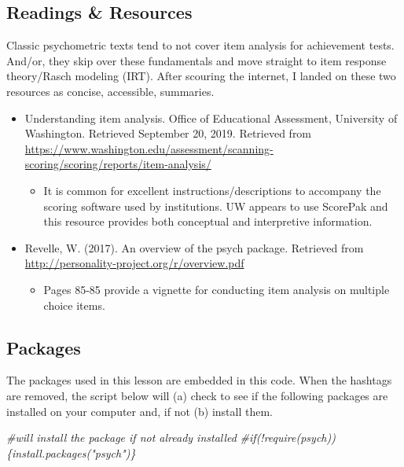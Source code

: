 \documentclass[
  english,
]{book}
\newenvironment{Shaded}{\begin{snugshade}}{\end{snugshade}}
\newcommand{\CommentTok}[1]{\textcolor[rgb]{0.56,0.35,0.01}{\textit{#1}}}
\providecommand{\tightlist}{%
  \setlength{\itemsep}{0pt}\setlength{\parskip}{0pt}}
\begin{document}
\hypertarget{readings-resources-4}{%
\subsection{Readings \& Resources}\label{readings-resources-4}}

Classic psychometric texts tend to not cover item analysis for achievement tests. And/or, they skip over these fundamentals and move straight to item response theory/Rasch modeling (IRT). After scouring the internet, I landed on these two resources as concise, accessible, summaries.

\begin{itemize}
\tightlist
\item
  Understanding item analysis. Office of Educational Assessment, University of Washington. Retrieved September 20, 2019. Retrieved from \url{https://www.washington.edu/assessment/scanning-scoring/scoring/reports/item-analysis/}

  \begin{itemize}
  \tightlist
  \item
    It is common for excellent instructions/descriptions to accompany the scoring software used by institutions. UW appears to use ScorePak and this resource provides both conceptual and interpretive information.
  \end{itemize}
\item
  Revelle, W. (2017). An overview of the psych package. Retrieved from \url{http://personality-project.org/r/overview.pdf}

  \begin{itemize}
  \tightlist
  \item
    Pages 85-85 provide a vignette for conducting item analysis on multiple choice items.
  \end{itemize}
\end{itemize}

\hypertarget{packages-4}{%
\subsection{Packages}\label{packages-4}}

The packages used in this lesson are embedded in this code. When the hashtags are removed, the script below will (a) check to see if the following packages are installed on your computer and, if not (b) install them.

\begin{Shaded}
\begin{Highlighting}[]
\CommentTok{#will install the package if not already installed}
\CommentTok{#if(!require(psych))\{install.packages("psych")\}}
\end{Highlighting}
\end{Shaded}
\end{document}
